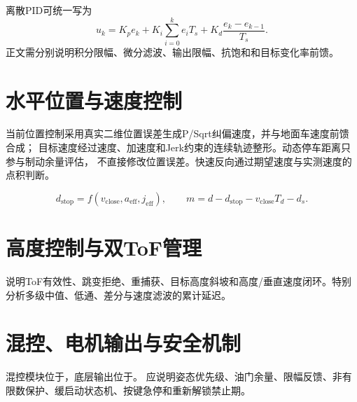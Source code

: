 离散PID可统一写为
\begin{equation}
u_k=K_p e_k+K_i\sum_{i=0}^{k}e_iT_s+K_d\frac{e_k-e_{k-1}}{T_s}.
\end{equation}
正文需分别说明积分限幅、微分滤波、输出限幅、抗饱和和目标变化率前馈。

\section{水平位置与速度控制}

当前位置控制采用真实二维位置误差生成P/Sqrt纠偏速度，并与地面车速度前馈合成；
目标速度经过速度、加速度和Jerk约束的连续轨迹整形。动态停车距离只参与制动余量评估，
不直接修改位置误差。快速反向通过期望速度与实测速度的点积判断。

\begin{equation}
  d_{\mathrm{stop}}=f(v_{\mathrm{close}},a_{\mathrm{eff}},j_{\mathrm{eff}}),\qquad
  m=d-d_{\mathrm{stop}}-v_{\mathrm{close}}T_d-d_s .
\end{equation}


\section{高度控制与双ToF管理}

说明ToF有效性、跳变拒绝、重捕获、目标高度斜坡和高度/垂直速度闭环。特别分析多级中值、低通、差分与速度滤波的累计延迟。

\section{混控、电机输出与安全机制}

混控模块位于，底层输出位于。
应说明姿态优先级、油门余量、限幅反馈、非有限数保护、缓启动状态机、按键急停和重新解锁禁止期。

